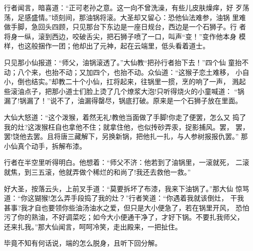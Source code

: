 行者闻言，暗喜道：“正可老孙之意。这一向不曾洗澡，有些儿皮肤燥痒，好
歹荡荡，足感盛情。”顷刻间，那油锅将滚。大圣却又留心：恐他仙法难参，油锅
里难做手脚，急回头四顾，只见那台下东边是一座日规台，西边是一个石狮子。行
者将身一纵，滚到西边，咬破舌尖，把石狮子喷了一口，叫声“变！”变作他本身
模样，也这般捆作一团；他却出了元神，起在云端里，低头看着道士。

只见那小仙报道：“师父，油锅滚透了。”大仙教“把孙行者抬下去！”四个仙
童抬不动；八个来，也抬不动；又加四个，也抬不动。众仙道：“这猴子恋土难移，
小自小，倒也结实。”却教二十个小仙，扛将起来，往锅里一掼，烹的响了一声，
溅起些滚油点子，把那小道士们脸上烫了几个燎浆大泡!只听得烧火的小童喊道：
“锅漏了!锅漏了！”说不了，油漏得罄尽，锅底打破。原来是一个石狮子放在里面。

大仙大怒道：“这个泼猴，着然无礼!教他当面做了手脚!你走了便罢，怎么又
捣了我的灶?这泼猴枉自也拿他不住；就拿住他，也似抟砂弄汞，捉影捕风。罢，
罢，罢!饶他去罢。且将唐三藏解下，另换新锅，把他扎一扎，与人参树报报仇罢。”
那小仙真个动手，拆解布漆。

行者在半空里听得明白。他想着：“师父不济：他若到了油锅里，一滚就死，
二滚就焦，到三五滚，他就弄做个稀烂的和尚了!我还去救他一救。”

好大圣，按落云头，上前叉手道：“莫要拆坏了布漆，我来下油锅了。”那大仙
惊骂道：“你这猢猴!怎么弄手段捣了我的灶？”行者笑道：“你遇着我就该倒灶，
干我甚事?我才自也要领你些油汤油水之爱，但只是大小便急了，若在锅里开风，
恐怕污了你的熟油，不好调菜吃；如今大小便通干净了，才好下锅。不要扎我师父，
还来扎我。”那大仙闻言，呵呵冷笑，走出殿来，一把扯住。

毕竟不知有何话说，端的怎么脱身，且听下回分解。